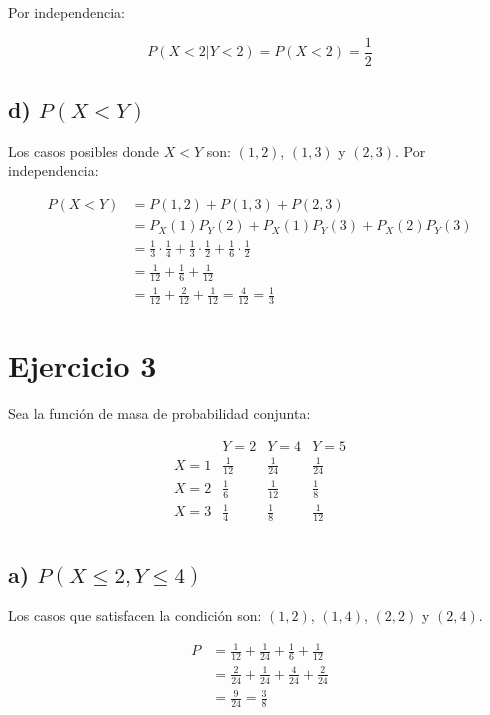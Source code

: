 \documentclass{article}
\begin{document}
Por independencia:

\[
P(X < 2 | Y < 2) = P(X < 2) = \frac{1}{2}
\]

\subsection*{d) \(P(X < Y)\)}

Los casos posibles donde \(X < Y\) son: \((1,2)\), \((1,3)\) y \((2,3)\). Por independencia:

\[
\begin{aligned}
P(X < Y) &= P(1,2) + P(1,3) + P(2,3) \\
&= P_X(1)P_Y(2) + P_X(1)P_Y(3) + P_X(2)P_Y(3) \\
&= \frac{1}{3} \cdot \frac{1}{4} + \frac{1}{3} \cdot \frac{1}{2} + \frac{1}{6} \cdot \frac{1}{2} \\
&= \frac{1}{12} + \frac{1}{6} + \frac{1}{12} \\
&= \frac{1}{12} + \frac{2}{12} + \frac{1}{12} = \frac{4}{12} = \frac{1}{3}
\end{aligned}
\]

\section*{Ejercicio 3}

Sea la función de masa de probabilidad conjunta:

\[
\begin{array}{c|ccc}
 & Y = 2 & Y = 4 & Y = 5 \\
\hline
X = 1 & \frac{1}{12} & \frac{1}{24} & \frac{1}{24} \\
X = 2 & \frac{1}{6} & \frac{1}{12} & \frac{1}{8} \\
X = 3 & \frac{1}{4} & \frac{1}{8} & \frac{1}{12} \\
\end{array}
\]

\subsection*{a) \(P(X \leq 2, Y \leq 4)\)}

Los casos que satisfacen la condición son: \((1,2)\), \((1,4)\), \((2,2)\) y \((2,4)\).

\[
\begin{aligned}
P &= \frac{1}{12} + \frac{1}{24} + \frac{1}{6} + \frac{1}{12} \\
&= \frac{2}{24} + \frac{1}{24} + \frac{4}{24} + \frac{2}{24} \\
&= \frac{9}{24} = \frac{3}{8}
\end{aligned}
\]
\end{document}
